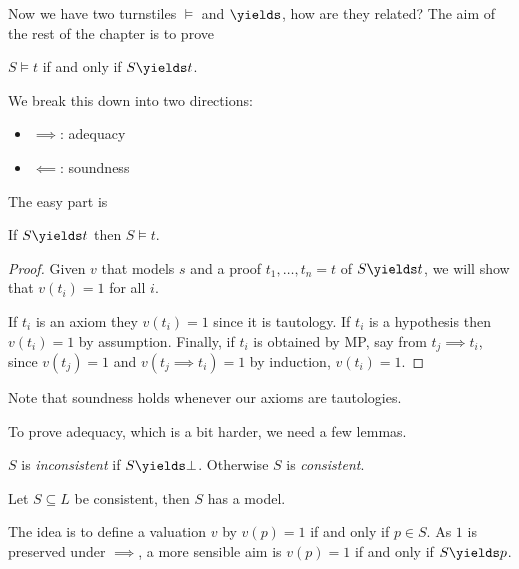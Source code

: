 \documentclass[a4paper]{article}
\begin{document}
Now we have two turnstiles \(\models\) and \(\yields\), how are they related? The aim of the rest of the chapter is to prove

\begin{theorem}
  \(S \models t\) if and only if \(S \yields t\).
\end{theorem}

We break this down into two directions:
\begin{itemize}
\item \(\implies\): adequacy
\item \(\impliedby\): soundness
\end{itemize}

The easy part is

\begin{proposition}[Soundness]
  If \(S \yields t\) then \(S \models t\).
\end{proposition}

\begin{proof}
  Given \(v\) that models \(s\) and a proof \(t_1, \dots, t_n = t\) of \(S \yields t\), we will show that \(v(t_i) = 1\) for all \(i\).

  If \(t_i\) is an axiom they \(v(t_i) = 1\) since it is tautology. If \(t_i\) is a hypothesis then \(v(t_i) = 1\) by assumption. Finally, if \(t_i\) is obtained by MP, say from \(t_j \implies t_i\), since \(v(t_j) = 1\) and \(v(t_j \implies t_i) = 1\) by induction, \(v(t_i) = 1\).
\end{proof}

Note that soundness holds whenever our axioms are tautologies.

To prove adequacy, which is a bit harder, we need a few lemmas.

\begin{definition}[Consistency]
  \(S\) is \emph{inconsistent} if \(S \yields \bot\). Otherwise \(S\) is \emph{consistent}.
\end{definition}

\begin{theorem}
  Let \(S \subseteq L\) be consistent, then \(S\) has a model.
\end{theorem}

The idea is to define a valuation \(v\) by \(v(p) = 1\) if and only if \(p \in S\). As \(1\) is preserved under \(\implies\), a more sensible aim is \(v(p) = 1\) if and only if \(S \yields p\).
\end{document}
